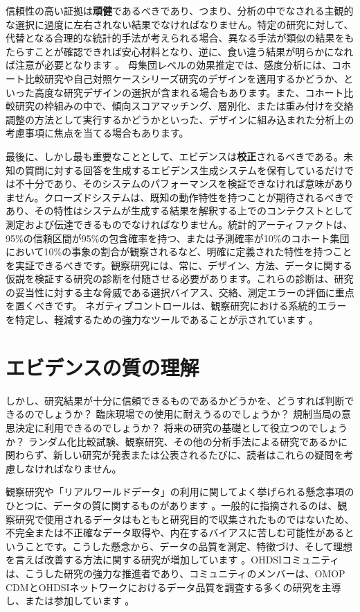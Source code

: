 \documentclass[
  11pt]{book}
\theoremstyle{definition}
\theoremstyle{definition}
\theoremstyle{definition}
\theoremstyle{definition}
\theoremstyle{remark}
\begin{document}
信頼性の高い証拠は\textbf{頑健}であるべきであり、つまり、分析の中でなされる主観的な選択に過度に左右されない結果でなければなりません。特定の研究に対して、代替となる合理的な統計的手法が考えられる場合、異なる手法が類似の結果をもたらすことが確認できれば安心材料となり、逆に、食い違う結果が明らかになれば注意が必要となります \citep{madigan2013design} 。 母集団レベルの効果推定では、感度分析には、コホート比較研究や自己対照ケースシリーズ研究のデザインを適用するかどうか、といった高度な研究デザインの選択が含まれる場合もあります。また、コホート比較研究の枠組みの中で、傾向スコアマッチング、層別化、または重み付けを交絡調整の方法として実行するかどうかといった、デザインに組み込まれた分析上の考慮事項に焦点を当てる場合もあります。

最後に、しかし最も重要なこととして、エビデンスは\textbf{校正}されるべきである。未知の質問に対する回答を生成するエビデンス生成システムを保有しているだけでは不十分であり、そのシステムのパフォーマンスを検証できなければ意味がありません。クローズドシステムは、既知の動作特性を持つことが期待されるべきであり、その特性はシステムが生成する結果を解釈する上でのコンテクストとして測定および伝達できるものでなければなりません。統計的アーティファクトは、95\%の信頼区間が95\%の包含確率を持つ、または予測確率が10\%のコホート集団において10\%の事象の割合が観察されるなど、明確に定義された特性を持つことを実証できるべきです。観察研究には、常に、デザイン、方法、データに関する仮説を検証する研究の診断を付随させる必要があります。これらの診断は、研究の妥当性に対する主な脅威である選択バイアス、交絡、測定エラーの評価に重点を置くべきです。 ネガティブコントロールは、観察研究における系統的エラーを特定し、軽減するための強力なツールであることが示されています \citep{schuemie_2016, schuemie_2018, schuemie_2018b} 。

\section{エビデンスの質の理解}\label{ux30a8ux30d3ux30c7ux30f3ux30b9ux306eux8ceaux306eux7406ux89e3}

しかし、研究結果が十分に信頼できるものであるかどうかを、どうすれば判断できるのでしょうか？ 臨床現場での使用に耐えうるのでしょうか？ 規制当局の意思決定に利用できるのでしょうか？ 将来の研究の基礎として役立つのでしょうか？ ランダム化比較試験、観察研究、その他の分析手法による研究であるかに関わらず、新しい研究が発表または公表されるたびに、読者はこれらの疑問を考慮しなければなりません。

観察研究や「リアルワールドデータ」の利用に関してよく挙げられる懸念事項のひとつに、データの質に関するものがあります \citep{botsis2010secondary, hersh2013caveats, sherman2016real} 。一般的に指摘されるのは、観察研究で使用されるデータはもともと研究目的で収集されたものではないため、不完全または不正確なデータ取得や、内在するバイアスに苦しむ可能性があるということです。こうした懸念から、データの品質を測定、特徴づけ、そして理想を言えば改善する方法に関する研究が増加しています \citep{kahn2012pragmatic, liaw2013towards, weiskopf_2013} 。OHDSIコミュニティは、こうした研究の強力な推進者であり、コミュニティのメンバーは、OMOP CDMとOHDSIネットワークにおけるデータ品質を調査する多くの研究を主導し、または参加しています \citep{huser_multisite_2016, kahn_transparent_2015, callahan2017comparison, yoon_2016} 。
\end{document}
